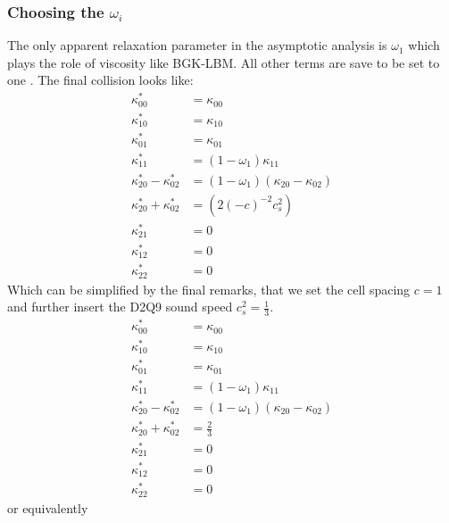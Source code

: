 \documentclass{article}
\begin{document}
\subsubsection{Choosing the \texorpdfstring{$\omega_i$}{omegai}}
\label{subs:Choosing the omega_i}
The only apparent relaxation parameter in the asymptotic analysis is $\omega_1$ which plays the role of viscosity like BGK-LBM.\@
All other terms are save to be set to one .
The final collision looks like:
\begin{equation}
  \begin{aligned}
    \kappa_{00}^{*} & = \kappa_{00} \\
    \kappa_{10}^{*} & = \kappa_{10} \\
    \kappa_{01}^{*} & = \kappa_{01} \\
    \kappa_{11}^{*} & = (1-\omega_1)\kappa_{11} \\
    \kappa_{20}^{*} - \kappa_{02}^{*}
      & = (1-\omega_1) (\kappa_{20} - \kappa_{02}) \\
    \kappa_{20}^{*} + \kappa_{02}^{*}
      & = \left( 2 {(-c)}^{-2} c_s^2 \right) \\
    \kappa_{21}^{*} & = 0 \\
    \kappa_{12}^{*} & = 0 \\
    \kappa_{22}^{*} & = 0
  \end{aligned}
\end{equation}
Which can be simplified by the final remarks, that we set the cell spacing $c=1$ and further insert the D2Q9 sound speed $c_s^2=\frac{1}{3}$.
\begin{equation}
  \begin{aligned}
    \kappa_{00}^{*} & = \kappa_{00} \\
    \kappa_{10}^{*} & = \kappa_{10} \\
    \kappa_{01}^{*} & = \kappa_{01} \\
    \kappa_{11}^{*} & = (1-\omega_1)\kappa_{11} \\
    \kappa_{20}^{*} - \kappa_{02}^{*}
      & = (1-\omega_1) (\kappa_{20} - \kappa_{02}) \\
    \kappa_{20}^{*} + \kappa_{02}^{*}
      & =  \frac{2}{3} \\
    \kappa_{21}^{*} & = 0 \\
    \kappa_{12}^{*} & = 0 \\
    \kappa_{22}^{*} & = 0
  \end{aligned}
\end{equation}
or equivalently
\end{document}
